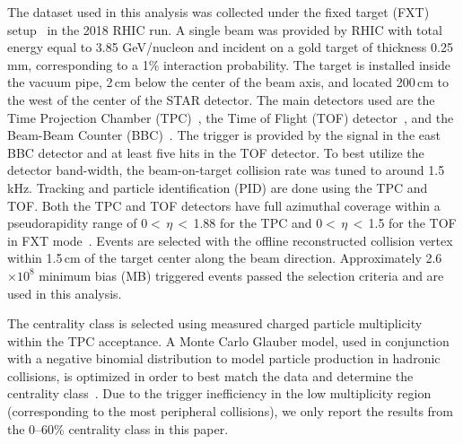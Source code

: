 \documentclass[aps,tightenlines,superscriptaddress,twocolumn]{revtex4-1}
\begin{document}
The dataset used in this analysis
was collected under the fixed target (FXT) setup~\cite{Meehan_2016} in the 2018 RHIC run. 
A single beam was provided by RHIC with total energy equal to 3.85 GeV/nucleon and incident on a gold target of thickness 0.25 mm, corresponding to a 1\% interaction probability.
The target is installed inside the vacuum pipe, 2\,cm below the center of the beam axis, and located 200\,cm to the west of the center of the STAR detector. The main detectors used are the Time Projection Chamber (TPC)~\cite{TPC:2003,Meehan_2016}, the Time of Flight (TOF) detector~\cite{TOF:2012,Meehan_2016}, and the Beam-Beam Counter (BBC)~\cite{BBC_Whitten:2008}. The trigger is provided by the signal in the east BBC detector and at least five hits in the TOF detector.
To best utilize the detector band-width, the beam-on-target collision rate was tuned to around 1.5\,kHz. 
Tracking and particle identification (PID) are done using the TPC and TOF. Both the TPC and TOF detectors have full azimuthal coverage within a pseudorapidity range of 0$<$\,$\eta$\,$<$\,1.88 for the TPC and 0$<$\,$\eta$\,$<$\,1.5 for the TOF in FXT mode~\cite{TPC:2003,TOF:2012,Meehan_2016}.
Events are selected with the offline reconstructed collision vertex within 1.5\,cm of the target center along the beam direction. Approximately 2.6$\times 10^{8}$ minimum bias (MB) triggered events passed the selection criteria and are used in this analysis. 

The centrality class is selected using measured charged particle multiplicity within the TPC acceptance. 
A Monte Carlo Glauber model, used in conjunction with a negative binomial distribution to model particle production in hadronic collisions, is optimized in order to best match the data and determine the centrality class~\cite{MC_Ray_2008,STAR:2021fge}.
Due to the trigger inefficiency in the low multiplicity region (corresponding to the most peripheral collisions), we only report the results from the 0--60\% centrality class in this paper.
\end{document}
